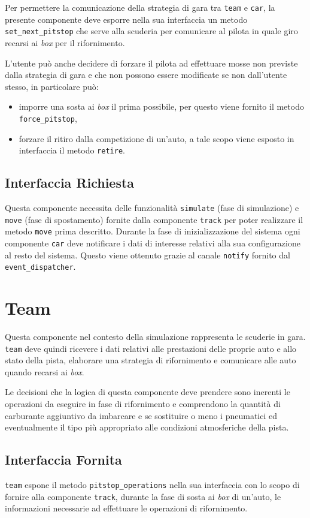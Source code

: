 \documentclass[11pt,a4paper]{report}
\newcommand{\fun}[1]{\texttt{#1}}
\begin{document}
Per permettere la comunicazione della strategia di gara tra \texttt{team} e \texttt{car}, la presente componente deve esporre nella sua interfaccia un metodo \fun{set\_next\_pitstop} che serve alla scuderia per comunicare al pilota in quale giro recarsi ai \textit{box} per il rifornimento.

L'utente può anche decidere di forzare il pilota ad effettuare mosse non previste dalla strategia di gara e che non possono essere modificate se non dall'utente stesso, in particolare può:
\begin{itemize}
\item imporre una sosta ai \textit{box} il prima possibile, per questo viene fornito il metodo \fun{force\_pitstop},
\item forzare il ritiro dalla competizione di un'auto, a tale scopo viene esposto in interfaccia il metodo \fun{retire}.
\end{itemize}

\subsection*{Interfaccia Richiesta}
Questa componente necessita delle funzionalità \fun{simulate} (fase di simulazione) e \fun{move} (fase di spostamento) fornite dalla componente \texttt{track} per poter realizzare il metodo \fun{move} prima descritto.
Durante la fase di inizializzazione del sistema ogni componente \texttt{car} deve notificare i dati di interesse relativi alla sua configurazione al resto del sistema. Questo viene ottenuto grazie al canale \fun{notify} fornito dal \texttt{event\_dispatcher}.

\section{Team}
Questa componente nel contesto della simulazione rappresenta le scuderie in gara. \texttt{team} deve quindi ricevere i dati relativi alle prestazioni delle proprie auto e allo stato della pista, elaborare una strategia di rifornimento e comunicare alle auto quando recarsi ai \textit{box}.

Le decisioni che la logica di questa componente deve prendere sono inerenti le operazioni da eseguire in fase di rifornimento e comprendono la quantità di carburante aggiuntivo da imbarcare e se sostituire o meno i pneumatici ed eventualmente il tipo più appropriato alle condizioni atmosferiche della pista.

\subsection*{Interfaccia Fornita}
\texttt{team} espone il metodo \fun{pitstop\_operations} nella sua interfaccia con lo scopo di fornire alla componente \texttt{track}, durante la fase di sosta ai \textit{box} di un'auto, le informazioni necessarie ad effettuare le operazioni di rifornimento.
\end{document}
